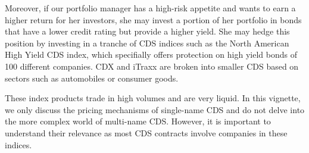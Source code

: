 \documentclass[article]{jss}
\begin{document}
Moreover, if our portfolio manager has a high-risk appetite and wants to earn a higher return for her investors, she may invest a portion of her portfolio in bonds that have a lower credit rating but provide a higher yield. She may hedge this position by investing in a tranche of CDS indices such as the North American High Yield CDS index, which specifially offers protection on high yield bonds of 100 different companies. CDX and iTraxx are broken into smaller CDS based on sectors such as automobiles or consumer goods.

These index products trade in high volumes and are very liquid. In this vignette, we only discuss the pricing mechanisms of single-name CDS and do not delve into the more complex world of multi-name CDS. However, it is important to understand their relevance as most CDS contracts involve companies in these indices.






\end{document}
